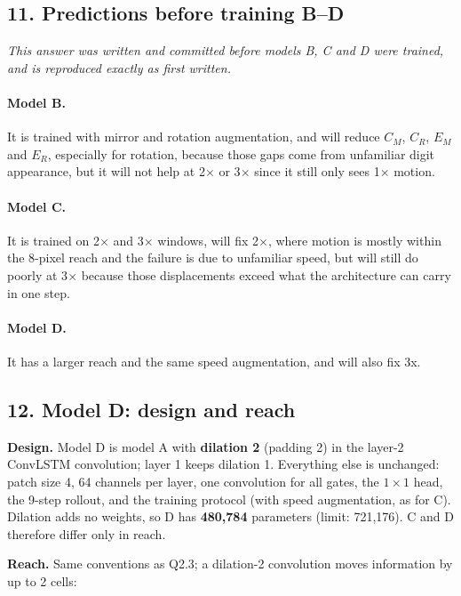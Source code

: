 \documentclass[11pt, a4paper]{article}
\begin{document}
\subsection*{11. Predictions before training B--D}

\textit{This answer was written and committed before models B, C and D were trained, and is reproduced exactly as first written.}

\paragraph{Model B.}
It is trained with mirror and rotation augmentation, and will reduce $C_M$, $C_R$, $E_M$ and $E_R$, especially for rotation, because those gaps come from unfamiliar digit appearance, but it will not help at 2$\times$ or 3$\times$ since it still only sees 1$\times$ motion.

\paragraph{Model C.}
It is trained on 2$\times$ and 3$\times$ windows, will fix 2$\times$, where motion is mostly within the 8-pixel reach and the failure is due to unfamiliar speed, but will still do poorly at 3$\times$ because those displacements exceed what the architecture can carry in one step.

\paragraph{Model D.}
It has a larger reach and the same speed augmentation, and will also fix 3x.

\subsection*{12. Model D: design and reach}

\textbf{Design.} Model D is model A with \textbf{dilation 2} (padding 2) in the layer-2 ConvLSTM convolution; layer 1 keeps dilation 1. Everything else is unchanged: patch size 4, 64 channels per layer, one convolution for all gates, the $1\times1$ head, the 9-step rollout, and the training protocol (with speed augmentation, as for C). Dilation adds no weights, so D has \textbf{480,784} parameters (limit: 721,176). C and D therefore differ only in reach.

\textbf{Reach.} Same conventions as Q2.3; a dilation-2 convolution moves information by up to 2 cells:
\end{document}
